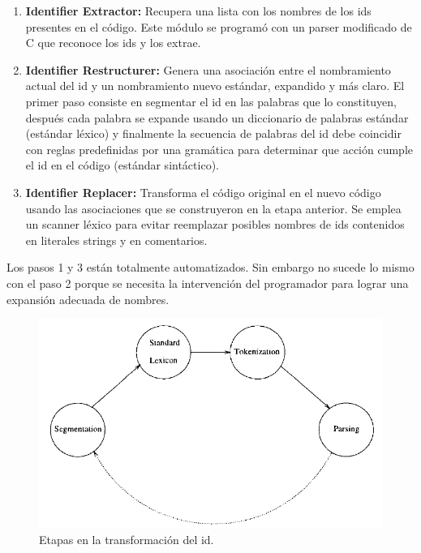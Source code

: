 \documentclass[12pt]{report}
\begin{document}
\begin{enumerate}
\itemsep0em%
\item \textbf{Identifier Extractor:} Recupera una lista con los nombres de los ids presentes en el código. Este módulo se programó con un parser modificado de C que reconoce los ids y los extrae.
\item \textbf{Identifier Restructurer:} Genera una asociación entre el nombramiento actual del id y un nombramiento nuevo estándar, expandido y más claro. El primer paso consiste en segmentar el id en las palabras que lo constituyen, después cada palabra se expande usando un diccionario de palabras estándar (estándar léxico) y finalmente la secuencia de palabras del id debe coincidir con reglas predefinidas por una gramática para determinar que acción cumple el id en el código (estándar sintáctico).
\item \textbf{Identifier Replacer:} Transforma el código original en el nuevo código usando las asociaciones que se construyeron en la etapa anterior. Se emplea un scanner léxico para evitar reemplazar posibles nombres de ids contenidos en literales strings y en comentarios.
\end{enumerate}

Los pasos 1 y 3 están totalmente automatizados. Sin embargo no sucede lo mismo con el paso 2 porque se necesita la intervención del programador para lograr una expansión adecuada de nombres.

\begin{figure}[h] %
\centering
\includegraphics[scale= 0.60]{./ire_2.png}
\caption{Etapas en la transformación del id.}
\label{ire2}
\end{figure}
\end{document}
